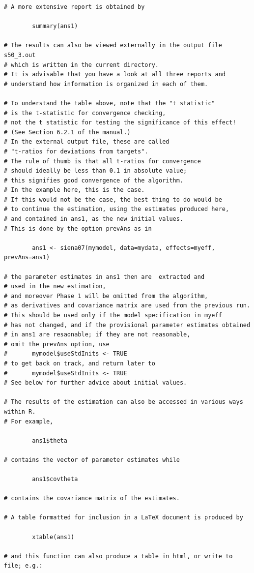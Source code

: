 \documentclass[a4paper,fleqn]{article}
\newcommand{\+}{\, + \,}
\begin{document}
{\begin{verbatim}
# A more extensive report is obtained by

        summary(ans1)

# The results can also be viewed externally in the output file s50_3.out
# which is written in the current directory.
# It is advisable that you have a look at all three reports and
# understand how information is organized in each of them.

# To understand the table above, note that the "t statistic"
# is the t-statistic for convergence checking,
# not the t statistic for testing the significance of this effect!
# (See Section 6.2.1 of the manual.)
# In the external output file, these are called
# "t-ratios for deviations from targets".
# The rule of thumb is that all t-ratios for convergence
# should ideally be less than 0.1 in absolute value;
# this signifies good convergence of the algorithm.
# In the example here, this is the case.
# If this would not be the case, the best thing to do would be
# to continue the estimation, using the estimates produced here,
# and contained in ans1, as the new initial values.
# This is done by the option prevAns as in

        ans1 <- siena07(mymodel, data=mydata, effects=myeff, prevAns=ans1)

# the parameter estimates in ans1 then are  extracted and
# used in the new estimation,
# and moreover Phase 1 will be omitted from the algorithm,
# as derivatives and covariance matrix are used from the previous run.
# This should be used only if the model specification in myeff
# has not changed, and if the provisional parameter estimates obtained
# in ans1 are resaonable; if they are not reasonable,
# omit the prevAns option, use
#       mymodel$useStdInits <- TRUE
# to get back on track, and return later to
#       mymodel$useStdInits <- TRUE
# See below for further advice about initial values.

# The results of the estimation can also be accessed in various ways within R.
# For example,

        ans1$theta

# contains the vector of parameter estimates while

        ans1$covtheta

# contains the covariance matrix of the estimates.

# A table formatted for inclusion in a LaTeX document is produced by

        xtable(ans1)

# and this function can also produce a table in html, or write to file; e.g.:


\end{verbatim}}
\end{document}
